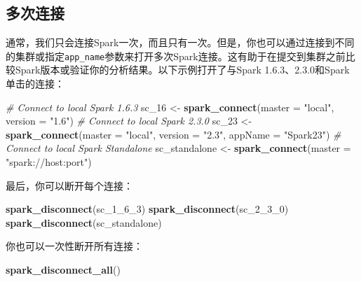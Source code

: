 \documentclass[
]{article}
\newenvironment{Shaded}{\begin{snugshade}}{\end{snugshade}}
\newcommand{\CommentTok}[1]{\textcolor[rgb]{0.56,0.35,0.01}{\textit{#1}}}
\newcommand{\DataTypeTok}[1]{\textcolor[rgb]{0.13,0.29,0.53}{#1}}
\newcommand{\DecValTok}[1]{\textcolor[rgb]{0.00,0.00,0.81}{#1}}
\newcommand{\KeywordTok}[1]{\textcolor[rgb]{0.13,0.29,0.53}{\textbf{#1}}}
\newcommand{\NormalTok}[1]{#1}
\newcommand{\StringTok}[1]{\textcolor[rgb]{0.31,0.60,0.02}{#1}}
\begin{document}
\hypertarget{ux591aux6b21ux8fdeux63a5}{%
\subsection{多次连接}\label{ux591aux6b21ux8fdeux63a5}}

通常，我们只会连接Spark一次，而且只有一次。但是，你也可以通过连接到不同的集群或指定\texttt{app\_name}参数来打开多次Spark连接。这有助于在提交到集群之前比较Spark版本或验证你的分析结果。以下示例打开了与Spark
1.6.3、2.3.0和Spark单击的连接：

\begin{Shaded}
\begin{Highlighting}[]
\CommentTok{# Connect to local Spark 1.6.3}
\NormalTok{sc_}\DecValTok{16}\NormalTok{ <-}\StringTok{ }\KeywordTok{spark_connect}\NormalTok{(}\DataTypeTok{master =} \StringTok{"local"}\NormalTok{, }\DataTypeTok{version =} \StringTok{"1.6"}\NormalTok{)}
\CommentTok{# Connect to local Spark 2.3.0}
\NormalTok{sc_}\DecValTok{23}\NormalTok{ <-}\StringTok{ }\KeywordTok{spark_connect}\NormalTok{(}\DataTypeTok{master =} \StringTok{"local"}\NormalTok{, }\DataTypeTok{version =} \StringTok{"2.3"}\NormalTok{, }\DataTypeTok{appName =} \StringTok{"Spark23"}\NormalTok{)}
\CommentTok{# Connect to local Spark Standalone}
\NormalTok{sc_standalone <-}\StringTok{ }\KeywordTok{spark_connect}\NormalTok{(}\DataTypeTok{master =} \StringTok{"spark://host:port"}\NormalTok{)}
\end{Highlighting}
\end{Shaded}

最后，你可以断开每个连接：

\begin{Shaded}
\begin{Highlighting}[]
\KeywordTok{spark_disconnect}\NormalTok{(sc_}\DecValTok{1}\NormalTok{_}\DecValTok{6}\NormalTok{_}\DecValTok{3}\NormalTok{)}
\KeywordTok{spark_disconnect}\NormalTok{(sc_}\DecValTok{2}\NormalTok{_}\DecValTok{3}\NormalTok{_}\DecValTok{0}\NormalTok{)}
\KeywordTok{spark_disconnect}\NormalTok{(sc_standalone)}
\end{Highlighting}
\end{Shaded}

你也可以一次性断开所有连接：

\begin{Shaded}
\begin{Highlighting}[]
\KeywordTok{spark_disconnect_all}\NormalTok{()}
\end{Highlighting}
\end{Shaded}
\end{document}
